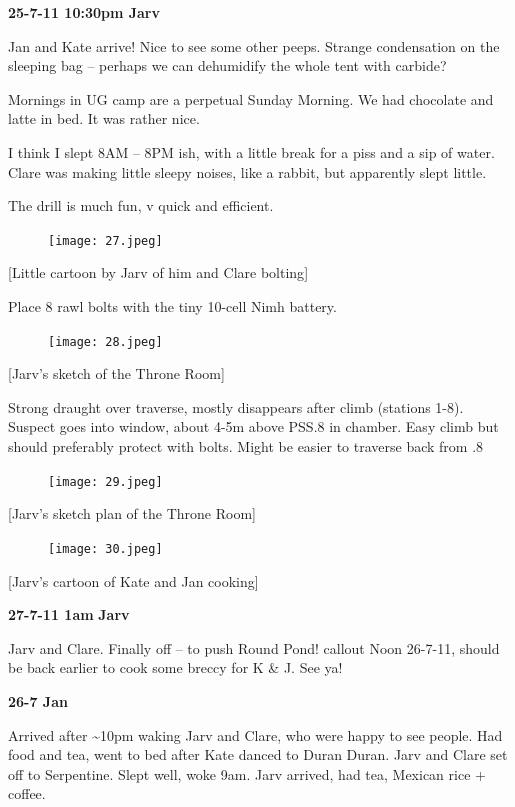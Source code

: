\textbf{25-7-11 10:30pm Jarv}

Jan and Kate arrive! Nice to see some other peeps. Strange condensation
on the sleeping bag -- perhaps we can dehumidify the whole tent with
carbide?

Mornings in UG camp are a perpetual Sunday Morning. We had chocolate and
latte in bed. It was rather nice.

I think I slept 8AM -- 8PM ish, with a little break for a piss and a sip
of water. Clare was making little sleepy noises, like a rabbit, but
apparently slept little.

The drill is much fun, v quick and efficient.

\begin{figure}[htbp]
\centering
\texttt{[image: 27.jpeg]}
\caption{}
\end{figure}

{[}Little cartoon by Jarv of him and Clare bolting{]}

Place 8 rawl bolts with the tiny 10-cell Nimh battery.

\begin{figure}[htbp]
\centering
\texttt{[image: 28.jpeg]}
\caption{}
\end{figure}

{[}Jarv's sketch of the Throne Room{]}

Strong draught over traverse, mostly disappears after climb (stations
1-8). Suspect goes into window, about 4-5m above PSS.8 in chamber. Easy
climb but should preferably protect with bolts. Might be easier to
traverse back from .8

\begin{figure}[htbp]
\centering
\texttt{[image: 29.jpeg]}
\caption{}
\end{figure}

{[}Jarv's sketch plan of the Throne Room{]}

\begin{figure}[htbp]
\centering
\texttt{[image: 30.jpeg]}
\caption{}
\end{figure}

{[}Jarv's cartoon of Kate and Jan cooking{]}

\textbf{27-7-11 1am} \textbf{Jarv}

Jarv and Clare. Finally off -- to push Round Pond! callout Noon 26-7-11,
should be back earlier to cook some breccy for K \& J. See ya!

\textbf{26-7 Jan}

Arrived after \textasciitilde{}10pm waking Jarv and Clare, who were
happy to see people. Had food and tea, went to bed after Kate danced to
Duran Duran. Jarv and Clare set off to Serpentine. Slept well, woke 9am.
Jarv arrived, had tea, Mexican rice + coffee.

